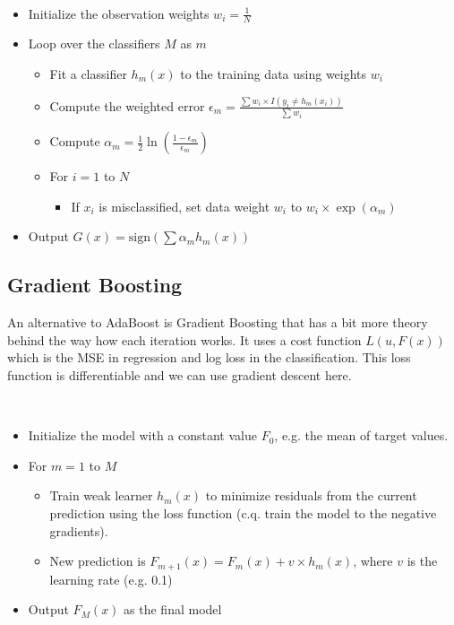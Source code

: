 \begin{definition}[AdaBoost]
  ~
  \begin{itemize}
    \item Initialize the observation weights $w_i = \frac{1}{N}$
    \item Loop over the classifiers $M$ as $m$
      \begin{itemize}
        \item Fit a classifier $h_m(x)$ to the training data using weights $w_i$
        \item Compute the weighted error $\epsilon_m = \frac{
            \sum w_i \times I(y_i \neq h_m(x_i))
          }{
            \sum w_i
          }$
        \item Compute $\alpha_m = \frac{1}{2} \ln ( \frac{1 -
          \epsilon_m}{\epsilon_m} )$
        \item For $i = 1$ to $N$
          \begin{itemize}
            \item If $x_i$ is misclassified, set data weight $w_i$ to
              $w_i \times \exp(\alpha_m)$
          \end{itemize}
      \end{itemize}
    \item Output $G(x) = \text{sign}(\sum \alpha_m h_m(x))$
  \end{itemize}
\end{definition}

\subsection{Gradient Boosting}

An alternative to AdaBoost is Gradient Boosting that has a bit more
theory behind the way how each iteration works. It uses a cost function
$L(u, F(x))$ which is the MSE in regression and log loss in the
classification. This loss function is differentiable and we can
use gradient descent here.

\begin{definition}
  ~
  \begin{itemize}
    \item Initialize the model with a constant value $F_0$, e.g. the mean
      of target values.
    \item For $m = 1$ to $M$
      \begin{itemize}
        \item Train weak learner $h_m(x)$ to minimize residuals from the current
          prediction using the loss function (c.q. train the model to
            the negative
          gradients).
        \item New prediction is $F_{m+1}(x) = F_m(x) + v \times h_m(x)$, where
          $v$ is the learning rate (e.g. 0.1)
      \end{itemize}
    \item Output $F_M(x)$ as the final model
  \end{itemize}
\end{definition}

